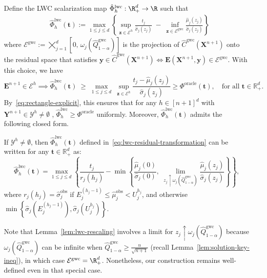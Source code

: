 Define the LWC scalarization map $\hat{\Phi}^{\mathrm{lwc}}_h: \R^d_+ \to \R$ such that
\begin{align}
\label{eq:lwc-residual-transformation}
& \hat{\Phi}^{\mathrm{lwc}}_h(\mathbf t)
:= \max_{1 \le j \le d}
\left\{
\sup_{\mathbf{z} \in \mathcal{E}^h}\frac{t_j}{\hat{\sigma}_j(z_j)}
\;-\;
\inf_{\mathbf{z} \in \mathcal{E}^{\mathrm{gwc}}}\frac{\hat{\mu}_j(z_j)}{\hat{\sigma}_j(z_j)}
\right\}
\end{align}
where $\mathcal{E}^{\mathrm{gwc}}
:= 
\bigtimes_{j=1}^{d} \left[0,\, \omega_j(\hat{Q}^{\mathrm{gwc}}_{1-\alpha})\right]$ is the projection of $\hat{C}^\mathrm{gwc}(\mathbf{X}^{n+1})$ onto the residual space that satisfies $\mathbf y \in \hat{C}^\mathrm{gwc}(\mathbf{X}^{n+1}) \iff \mathbf E(\mathbf{X}^{n+1}, \mathbf y) \in \mathcal{E}^{\mathrm{gwc}}$. 
With this choice, we have
\begin{equation}
\mathbf{E}^{n+1}\in \mathcal{E}^h\implies
\hat{\Phi}^{\mathrm{lwc}}_h(\mathbf t)
\;\ge\;
\max_{1 \le j \le d}\;
\sup_{\mathbf{z}\in \mathcal{E}^h}\frac{t_j-\hat{\mu}_j(z_j)}{\hat{\sigma}_j(z_j)} \geq \Phi^{\mathrm{oracle}}(\mathbf t),
\quad \text{for all } \mathbf t\in\mathbb{R}^d_+.
\label{eq:lwc-transformation-bound}
\end{equation}
By~\eqref{eq:rectangle-explicit}, this ensures that for any $h \in [n+1]^d$ with $\mathbf{Y}^{n+1} \in \mathcal{Y}^h \neq \emptyset$
, $\hat{\Phi}^{\mathrm{lwc}}_h\geq \Phi^{\mathrm{oracle}}$ uniformly. Moreover, $\hat{\Phi}^{\mathrm{lwc}}_h(\mathbf t)$ admits the following closed form.
\begin{lemma}
\label{lem:lwc-rescaling}
If $\mathcal{Y}^h\neq \emptyset$, then $\hat{\Phi}^{\mathrm{lwc}}_h(\mathbf t)$ defined in~\eqref{eq:lwc-residual-transformation} can be written for any $\mathbf t\in\mathbb{R}^d_+$ as:
\[
\hat{\Phi}^{\mathrm{lwc}}_h(\mathbf t)
= \max_{1 \le j \le d}
\left\{
\frac{t_j}{r_j(h_j)}
-
\min\!\left\{
\frac{\hat{\mu}_j(0)}{\hat{\sigma}_j(0)},\;
\lim_{z_j \uparrow \omega_j(\hat{Q}^{\mathrm{gwc}}_{1-\alpha})}
\frac{\hat{\mu}_j(z_j)}{\hat{\sigma}_j(z_j)}
\right\}
\right\},
\]
where $r_j(h_j)=\hat{\sigma}^\mathrm{obs}_j$ if $E^{(h_j-1)}_j \leq \hat{\mu}^\mathrm{obs}_j < U^{h_j}_j$, and otherwise $\min\left\{\hat{\sigma}_j(E^{(h_j-1)}_j), \hat{\sigma}_j(U^{h_j}_j)\right\}$.
\end{lemma}
Note that Lemma~\ref{lem:lwc-rescaling} involves a limit for $z_j \uparrow \omega_j(\hat{Q}^{\mathrm{gwc}}_{1-\alpha})$ because $\omega_j(\hat{Q}^{\mathrm{gwc}}_{1-\alpha})$ can be infinite when $\hat{Q}^{\mathrm{gwc}}_{1-\alpha} \geq \frac{n}{\sqrt{n+1}}$ (recall Lemma~\ref{lem:solution-key-ineq}), in which case $\mathcal{E}^\mathrm{gwc} = \R^d_+$. 
Nonetheless, our construction remains well-defined even in that special case.


